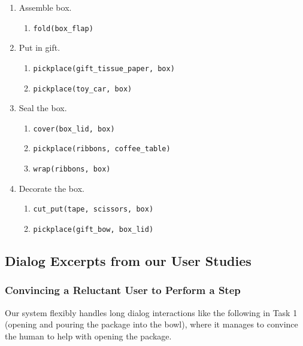 \begin{enumerate}
    \item Assemble box.
        \begin{enumerate}
            \item \texttt{fold(box\_flap)}
        \end{enumerate}
    \item Put in gift.
        \begin{enumerate}
            \item \texttt{pickplace(gift\_tissue\_paper, box)}
            \item \texttt{pickplace(toy\_car, box)}
        \end{enumerate}
    \item Seal the box.
        \begin{enumerate}
            \item \texttt{cover(box\_lid, box)}
            \item \texttt{pickplace(ribbons, coffee\_table)}
            \item \texttt{wrap(ribbons, box)}
        \end{enumerate}
    \item Decorate the box.
        \begin{enumerate}
            \item \texttt{cut\_put(tape, scissors, box)}
            \item \texttt{pickplace(gift\_bow, box\_lid)}
        \end{enumerate}
\end{enumerate}

\subsection{Dialog Excerpts from our User Studies}
\label{app:dialog-excerpt}

\subsubsection{Convincing a Reluctant User to Perform a Step}
Our system flexibly handles long dialog interactions like the following in Task 1 (opening and pouring the package into the bowl), where it manages to convince the human to help with opening the package.

